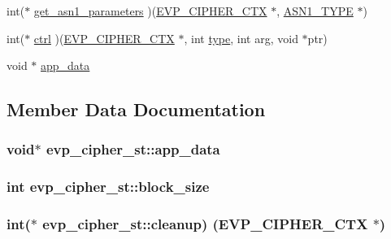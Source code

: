 \begin{DoxyCompactItemize}
\item 
int($\ast$ \hyperlink{structevp__cipher__st_a438856068bda2e643c3e1a713d77ad66}{get\+\_\+asn1\+\_\+parameters} )(\hyperlink{ossl__typ_8h_aab2bd6a044e1d31ebc2fe82b3b0b3d9a}{E\+V\+P\+\_\+\+C\+I\+P\+H\+E\+R\+\_\+\+C\+TX} $\ast$, \hyperlink{asn1_8h_a7895e03d9fee2bc4963faf2a31a9439e}{A\+S\+N1\+\_\+\+T\+Y\+PE} $\ast$)
\item 
int($\ast$ \hyperlink{structevp__cipher__st_a7f3ad30b0b90b5740b831b9e7aa43cbe}{ctrl} )(\hyperlink{ossl__typ_8h_aab2bd6a044e1d31ebc2fe82b3b0b3d9a}{E\+V\+P\+\_\+\+C\+I\+P\+H\+E\+R\+\_\+\+C\+TX} $\ast$, int \hyperlink{x509_8h_ab512b8f495325c7ea0f5a5a5d3f938eb}{type}, int arg, void $\ast$ptr)
\item 
void $\ast$ \hyperlink{structevp__cipher__st_a11371711dc0f64bacf01b3ad72cf90f3}{app\+\_\+data}
\end{DoxyCompactItemize}


\subsection{Member Data Documentation}
\subsubsection[{\texorpdfstring{app\+\_\+data}{app_data}}]{\setlength{\rightskip}{0pt plus 5cm}void$\ast$ evp\+\_\+cipher\+\_\+st\+::app\+\_\+data}\hypertarget{structevp__cipher__st_a11371711dc0f64bacf01b3ad72cf90f3}{}\label{structevp__cipher__st_a11371711dc0f64bacf01b3ad72cf90f3}
\subsubsection[{\texorpdfstring{block\+\_\+size}{block_size}}]{\setlength{\rightskip}{0pt plus 5cm}int evp\+\_\+cipher\+\_\+st\+::block\+\_\+size}\hypertarget{structevp__cipher__st_a63036565998126ddd20ba6b1b901df28}{}\label{structevp__cipher__st_a63036565998126ddd20ba6b1b901df28}
\subsubsection[{\texorpdfstring{cleanup}{cleanup}}]{\setlength{\rightskip}{0pt plus 5cm}int($\ast$ evp\+\_\+cipher\+\_\+st\+::cleanup) ({\bf E\+V\+P\+\_\+\+C\+I\+P\+H\+E\+R\+\_\+\+C\+TX} $\ast$)}\hypertarget{structevp__cipher__st_ab5d28076841224e07599d579fb7c0d28}{}\label{structevp__cipher__st_ab5d28076841224e07599d579fb7c0d28}
